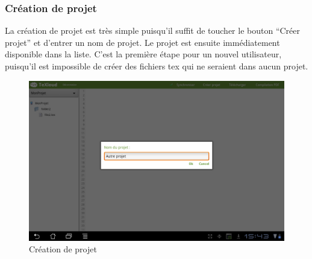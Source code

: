 \documentclass[a4paper,12pt]{article}
\begin{document}
\newpage
\subsubsection{Création de projet}
La création de projet est très simple puisqu'il suffit de toucher le bouton ``Créer projet'' et d'entrer un nom de projet. Le projet est ensuite immédiatement disponible dans la liste. C'est la première étape pour un nouvel utilisateur, puisqu'il est impossible 
de créer des fichiers tex qui ne seraient dans aucun projet.

\begin{figure}[!ht]
\begin{center}
  \includegraphics[width=1\textwidth]{./images/screenshot/creation_projet.png}
\end{center}
  \caption{Création de projet}
  \label{Création de projet}
\end{figure}
\paragraph*{}

\newpage
\end{document}
